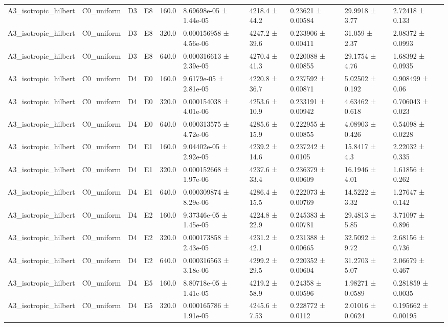 \begin{table}
\begin{tabular}{llllllllll}
A3\_isotropic\_hilbert & C0\_uniform & D3 & E8 & 160.0 & 8.69698e-05 ± 1.44e-05 & 4218.4 ± 44.2 & 0.23621 ± 0.00584 & 29.9918 ± 3.77 & 2.72418 ± 0.133 \\
A3\_isotropic\_hilbert & C0\_uniform & D3 & E8 & 320.0 & 0.000156958 ± 4.56e-06 & 4247.2 ± 39.6 & 0.233906 ± 0.00411 & 31.059 ± 2.37 & 2.08372 ± 0.0993 \\
A3\_isotropic\_hilbert & C0\_uniform & D3 & E8 & 640.0 & 0.000316613 ± 2.39e-05 & 4270.4 ± 41.3 & 0.220088 ± 0.00855 & 29.1754 ± 4.76 & 1.68392 ± 0.0935 \\
A3\_isotropic\_hilbert & C0\_uniform & D4 & E0 & 160.0 & 9.6179e-05 ± 2.81e-05 & 4220.8 ± 36.7 & 0.237592 ± 0.00871 & 5.02502 ± 0.192 & 0.908499 ± 0.06 \\
A3\_isotropic\_hilbert & C0\_uniform & D4 & E0 & 320.0 & 0.000154038 ± 4.01e-06 & 4253.6 ± 10.9 & 0.233191 ± 0.00942 & 4.63462 ± 0.618 & 0.706043 ± 0.023 \\
A3\_isotropic\_hilbert & C0\_uniform & D4 & E0 & 640.0 & 0.000313575 ± 4.72e-06 & 4285.6 ± 15.9 & 0.222955 ± 0.00855 & 4.08903 ± 0.426 & 0.54098 ± 0.0228 \\
A3\_isotropic\_hilbert & C0\_uniform & D4 & E1 & 160.0 & 9.04402e-05 ± 2.92e-05 & 4239.2 ± 14.6 & 0.237242 ± 0.0105 & 15.8417 ± 4.3 & 2.22032 ± 0.335 \\
A3\_isotropic\_hilbert & C0\_uniform & D4 & E1 & 320.0 & 0.000152668 ± 1.97e-06 & 4237.6 ± 33.4 & 0.236379 ± 0.00609 & 16.1946 ± 4.01 & 1.61856 ± 0.262 \\
A3\_isotropic\_hilbert & C0\_uniform & D4 & E1 & 640.0 & 0.000309874 ± 8.29e-06 & 4286.4 ± 15.5 & 0.222073 ± 0.00769 & 14.5222 ± 3.32 & 1.27647 ± 0.142 \\
A3\_isotropic\_hilbert & C0\_uniform & D4 & E2 & 160.0 & 9.37346e-05 ± 1.45e-05 & 4224.8 ± 22.9 & 0.245383 ± 0.00781 & 29.4813 ± 5.85 & 3.71097 ± 0.896 \\
A3\_isotropic\_hilbert & C0\_uniform & D4 & E2 & 320.0 & 0.000173858 ± 2.43e-05 & 4231.2 ± 42.1 & 0.231388 ± 0.00665 & 32.5092 ± 9.72 & 2.68156 ± 0.736 \\
A3\_isotropic\_hilbert & C0\_uniform & D4 & E2 & 640.0 & 0.000316563 ± 3.18e-06 & 4299.2 ± 29.5 & 0.220352 ± 0.00604 & 31.2703 ± 5.07 & 2.06679 ± 0.467 \\
A3\_isotropic\_hilbert & C0\_uniform & D4 & E5 & 160.0 & 8.80718e-05 ± 1.41e-05 & 4219.2 ± 58.9 & 0.24358 ± 0.00596 & 1.98271 ± 0.0589 & 0.281859 ± 0.0035 \\
A3\_isotropic\_hilbert & C0\_uniform & D4 & E5 & 320.0 & 0.000165786 ± 1.91e-05 & 4245.6 ± 7.53 & 0.228772 ± 0.0112 & 2.01016 ± 0.0624 & 0.195662 ± 0.00195 \\

\end{tabular}
\end{table}
